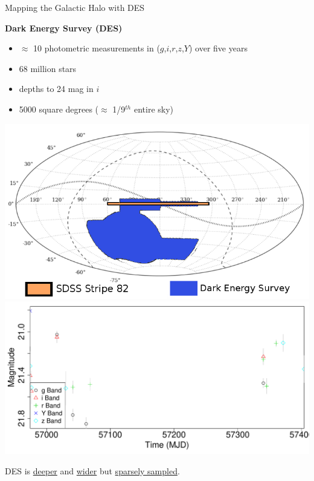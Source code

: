 \documentclass[12pt]{beamer}
\begin{document}
\begin{frame}{Mapping the Galactic Halo with DES}

\textbf{Dark Energy Survey (DES)}
\begin{itemize}
\item $\approx$ 10 photometric measurements in ($g$,$i$,$r$,$z$,$Y$) over five years
\item 68 million stars
\item depths to 24 mag in $i$
\item 5000 square degrees ($\approx$ 1/9$^{th}$ entire sky)
\end{itemize}

\vspace{.1in}
\includegraphics[scale=0.2]{figs/des_observing_strategy.png}
\includegraphics[scale=0.2]{figs/unfolded_des_2.pdf}

\vspace{.1in}

\begin{center}
  DES is \underline{deeper} and \underline{wider} but \underline{sparsely sampled}.
\end{center}

\end{frame}
\end{document}
